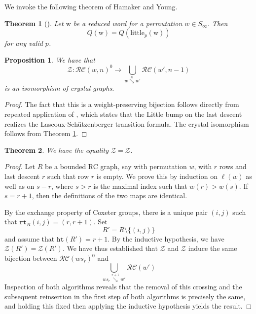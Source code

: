 \documentclass{amsart}
\newtheorem{proposition}[lemma]{Proposition}
\newtheorem{theorem}{Theorem}[section]
\theoremstyle{definition}
\theoremstyle{remark}
\numberwithin{equation}{subsection}
\DeclareMathOperator{\sch}{\mathfrak{S}}
\newcommand{\downvar}[1]{\stackrel{#1}{\searrow}}
\newcommand{\rtt}{\mathtt{rt}}
\newcommand{\zeromap}{\mathcal{Z}}
\newcommand{\hr}{\mathtt{ht}}
\newcommand{\RC}{\mathcal{RC}}
\newcommand{\lzeromap}{\mathscr{Z}}
\newcommand{\ltb}{\mathrm{little}}
\begin{document}
We invoke the following theorem of Hamaker and Young.

\begin{theorem}[{\cite[Theorem~4.4]{hamaker2014relating}}] \label{theorem:littlecrystal}
Let $\mathrm{w}$ be a reduced word for a permutation $w\in S_\infty$. Then
$$Q(\mathrm{w}) = Q(\ltb_p(\mathrm{w}))$$
for any valid $p$.
\end{theorem}


\begin{proposition} \label{proposition:zeroequal}
  We have that
$$\lzeromap:\RC(w, n)^0\to \bigcup_{w\downvar{n} w'}\RC(w', n-1)$$ 
	is an isomorphism of crystal graphs.
\end{proposition}
\begin{proof}
The fact that this is a weight-preserving bijection follows directly from repeated application of \cite[Lemma~7]{little2003combinatorial}, which states that the Little bump on the last descent realizes the Lascoux-Sch\"utzenberger transition formula. The crystal isomorphism follows from Theorem \ref{theorem:littlecrystal}.
\end{proof}

\begin{theorem} \label{theorem:zerocrystal}
We have the equality $\lzeromap=\zeromap$.
\end{theorem}
\begin{proof}
Let $R$ be a bounded RC graph, say with permutation $w$, with $r$ rows and last descent $r$ such that row $r$ is empty. We prove this by induction on $\ell(w)$ as well as on $s - r$, where $s>r$ is the maximal index such that $w(r)>w(s)$. If $s=r+1$, then the definitions of the two maps are identical. 

By the exchange property of Coxeter groups, there is a unique pair $(i,j)$ such that $\rtt_R(i, j) = (r, r+1)$. Set
$$R' = R\setminus\{(i,j)\}$$
and assume that $\hr(R') = r+1$. By the inductive hypothesis, we have $\lzeromap(R') = \zeromap(R')$. We have thus established that $\lzeromap$ and $\zeromap$ induce the same bijection between $\RC(ws_r)^0$ and 
$$\bigcup_{ws_r\downvar{r+1} w'}\RC(w')$$
Inspection of both algorithms reveals that the removal of this crossing and the subsequent reinsertion in the first step of both algorithms is precisely the same, and holding this fixed then applying the inductive hypothesis yields the result.
\end{proof}
\end{document}
